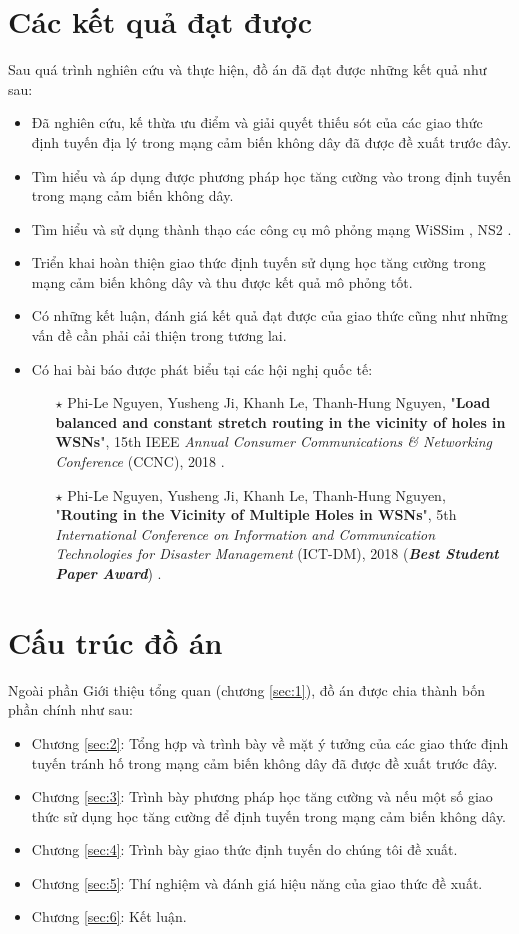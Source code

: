 \documentclass[12pt]{report}
\begin{document}
\section{Các kết quả đạt được}
\label{sec:1.5}
Sau quá trình nghiên cứu và thực hiện, đồ án đã đạt được những kết quả như sau:
\begin{itemize}
\item Đã nghiên cứu, kế thừa ưu điểm và giải quyết thiếu sót của các giao thức định tuyến địa lý trong mạng cảm biến không dây đã được đề xuất trước đây.
\item Tìm hiểu và áp dụng được phương pháp học tăng cường vào trong định tuyến trong mạng cảm biến không dây.
\item Tìm hiểu và sử dụng thành thạo các công cụ mô phỏng mạng WiSSim \cite{wissim}, NS2 \cite{ns2}.
\item Triển khai hoàn thiện giao thức định tuyến sử dụng học tăng cường trong mạng cảm biến không dây và thu được kết quả mô phỏng tốt.
\item Có những kết luận, đánh giá kết quả đạt được của giao thức cũng như những vấn đề cần phải cải thiện trong tương lai.
\item Có hai bài báo được phát biểu tại các hội nghị quốc tế: 
\begin{itemize}
\item[$\star$] Phi-Le Nguyen, Yusheng Ji, Khanh Le, Thanh-Hung Nguyen, "\textbf{Load balanced and constant stretch routing in the vicinity of holes in WSNs}", 15th IEEE \textit{Annual Consumer Communications \& Networking Conference} (CCNC), 2018 \cite{vhr}.
\item[$\star$] Phi-Le Nguyen, Yusheng Ji, Khanh Le, Thanh-Hung Nguyen, "\textbf{Routing in the Vicinity of Multiple Holes in WSNs}", 5th \textit{International Conference on Information and Communication Technologies for Disaster Management} (ICT-DM), 2018 (\textbf{\textit{Best Student Paper Award}}) \cite{bsmh}.
\end{itemize}
\end{itemize}
\section{Cấu trúc đồ án}
\label{sec:1.6}
Ngoài phần Giới thiệu tổng quan (chương \ref{sec:1}), đồ án được chia thành bốn phần chính như sau:
\begin{itemize}
\item Chương \ref{sec:2}: Tổng hợp và trình bày về mặt ý tưởng của các giao thức định tuyến tránh hố trong mạng cảm biến không dây đã được đề xuất trước đây.
\item Chương \ref{sec:3}: Trình bày phương pháp học tăng cường và nếu một số giao thức sử dụng học tăng cường để định tuyến trong mạng cảm biến không dây.
\item Chương \ref{sec:4}: Trình bày giao thức định tuyến do chúng tôi đề xuất.
\item Chương \ref{sec:5}: Thí nghiệm và đánh giá hiệu năng của giao thức đề xuất.
\item Chương \ref{sec:6}: Kết luận.
\end{itemize}
\end{document}
